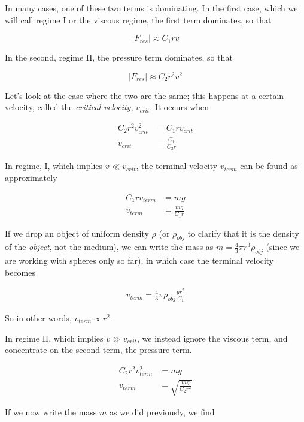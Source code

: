 In many cases, one of these two terms is dominating. In the first case, which we will call regime I or the viscous regime, the first term dominates, so that

\begin{equation}
|F_{res}| \approx C_1 r v
\end{equation}

In the second, regime II, the pressure term dominates, so that

\begin{equation}
|F_{res}| \approx C_2 r^2 v^2
\end{equation}

Let's look at the case where the two are the same; this happens at a certain velocity, called the \emph{critical velocity}, $v_{crit}$. It occurs when

\begin{align}
C_2 r^2 v_{crit}^2 &= C_1 r v_{crit}\\
v_{crit} &= \frac{C_1}{C_2 r}
\end{align}

In regime, I, which implies $v \ll v_{crit}$, the terminal velocity $v_{term}$ can be found as approximately

\begin{align}
C_1 r v_{term} &= m g\\
v_{term} &= \frac{m g}{C_1 r}
\end{align}

If we drop an object of uniform density $\rho$ (or $\rho_{obj}$ to clarify that it is the density of the \emph{object}, not the medium), we can write the mass as $m = \frac{4}{3} \pi r^3 \rho_{obj}$ (since we are working with spheres only so far), in which case the terminal velocity becomes

\begin{align}
v_{term} = \frac{4}{3} \pi \rho_{obj} \frac{g r^2}{C_1}
\end{align}

So in other words, $v_{term} \propto r^2$.

In regime II, which implies $v \gg v_{crit}$, we instead ignore the viscous term, and concentrate on the second term, the pressure term.

\begin{align}
C_2 r^2 v_{term}^2 &= m g\\
v_{term} &= \sqrt{\frac{m g}{C_2 r^2}}
\end{align}

If we now write the mass $m$ as we did previously, we find

